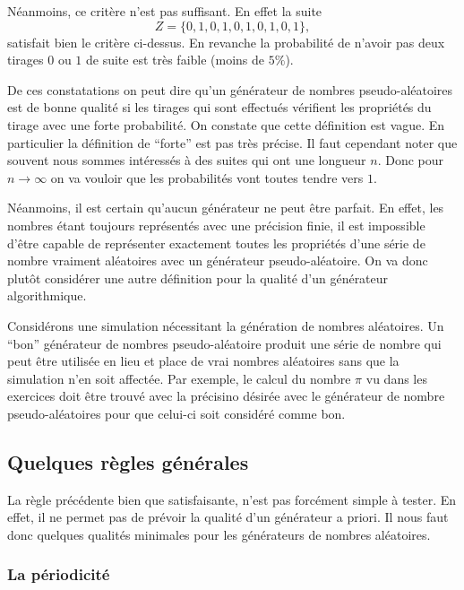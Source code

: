 \documentclass[a4paper,12pt]{book}
\begin{document}
Néanmoins, ce critère n'est pas suffisant. En effet la suite
\begin{equation}
 Z=\{0,1,0,1,0,1,0,1,0,1\},
\end{equation}
satisfait bien le critère ci-dessus. En revanche la probabilité de n'avoir pas deux tirages 
$0$ ou $1$ de suite est très faible (moins de $5\%$). 

De ces constatations on peut dire qu'un générateur de nombres pseudo-aléatoires est de bonne
qualité si les tirages qui sont effectués vérifient les propriétés du tirage 
avec une forte probabilité. On constate que cette définition est vague. En particulier
la définition de ``forte'' est pas très précise. Il faut cependant noter que
souvent nous sommes intéressés à des suites qui ont une longueur $n$. 
Donc pour $n\rightarrow\infty$ on va vouloir que les probabilités vont 
toutes tendre vers $1$. 

Néanmoins, il est certain qu'aucun générateur ne peut être parfait. En effet,
les nombres étant toujours représentés avec une précision finie, il est impossible
d'être capable de représenter exactement toutes les propriétés d'une série de nombre
vraiment aléatoires avec un générateur pseudo-aléatoire. On va donc plutôt
considérer une autre définition pour la qualité d'un générateur algorithmique.

Considérons une simulation nécessitant la génération de nombres aléatoires.
Un ``bon'' générateur de nombres pseudo-aléatoire produit une série de nombre
qui peut être utilisée en lieu et place de vrai nombres aléatoires sans que la simulation
n'en soit affectée. Par exemple, le calcul du nombre $\pi$ vu dans les exercices doit 
être trouvé avec la précisino désirée avec le générateur de nombre pseudo-aléatoires pour que celui-ci 
soit considéré comme bon.

\subsection{Quelques règles générales}

La règle précédente bien que satisfaisante, n'est pas forcément simple à tester. En effet,
il ne permet pas de prévoir la qualité d'un générateur a priori. Il nous faut donc quelques 
qualités minimales pour les générateurs de nombres aléatoires.

\subsubsection{La périodicité}
\end{document}
